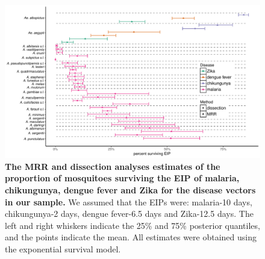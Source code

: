 \documentclass[12pt]{article}
\begin{document}
\begin{figure}[h]
	\centerline{\includegraphics[width=1.3\textwidth]{./Figure_files/eip_all_combined.pdf}}
	\caption{\textbf{The MRR and dissection analyses estimates of the proportion of mosquitoes surviving the EIP of malaria, chikungunya, dengue fever and Zika for the disease vectors in our sample.} We assumed that the EIPs were: malaria-10 days, chikungunya-2 days, dengue fever-6.5 days and Zika-12.5 days. The left and right whiskers indicate the 25\% and 75\% posterior quantiles, and the points indicate the mean. All estimates were obtained using the exponential survival model.}
	\label{fig:eip}
\end{figure}
\end{document}
